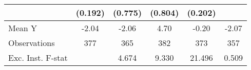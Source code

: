 {\begin{tabular}{l*{5}{c}}
            &     (0.192)         &     (0.775)         &     (0.804)         &     (0.202)         &                     \\
\midrule
Mean Y      &       -2.04         &       -2.06         &        4.70         &       -0.20         &       -2.07         \\
Observations&         377         &         365         &         382         &         373         &         357         \\
Exc. Inst. F-stat&                     &       4.674         &       9.330         &      21.496         &       0.509         \\
\bottomrule
\end{tabular}
}

